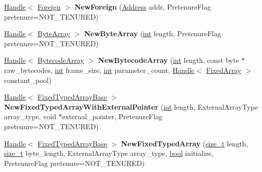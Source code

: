 \begin{DoxyCompactItemize}
\item 
\mbox{\label{classv8_1_1internal_1_1Factory_a885ff62ae48cfbc8fec78203f5eea4d3}} 
\mbox{\hyperlink{classv8_1_1internal_1_1Handle}{Handle}}$<$ \mbox{\hyperlink{classv8_1_1internal_1_1Foreign}{Foreign}} $>$ {\bfseries New\+Foreign} (\mbox{\hyperlink{classuintptr__t}{Address}} addr, Pretenure\+Flag pretenure=N\+O\+T\+\_\+\+T\+E\+N\+U\+R\+ED)
\item 
\mbox{\label{classv8_1_1internal_1_1Factory_a015cfffd3646432f2564a415c4834218}} 
\mbox{\hyperlink{classv8_1_1internal_1_1Handle}{Handle}}$<$ \mbox{\hyperlink{classv8_1_1internal_1_1ByteArray}{Byte\+Array}} $>$ {\bfseries New\+Byte\+Array} (\mbox{\hyperlink{classint}{int}} length, Pretenure\+Flag pretenure=N\+O\+T\+\_\+\+T\+E\+N\+U\+R\+ED)
\item 
\mbox{\label{classv8_1_1internal_1_1Factory_ad5646803ce9c460f62c27d468c5fbc51}} 
\mbox{\hyperlink{classv8_1_1internal_1_1Handle}{Handle}}$<$ \mbox{\hyperlink{classv8_1_1internal_1_1BytecodeArray}{Bytecode\+Array}} $>$ {\bfseries New\+Bytecode\+Array} (\mbox{\hyperlink{classint}{int}} length, const byte $\ast$raw\+\_\+bytecodes, \mbox{\hyperlink{classint}{int}} frame\+\_\+size, \mbox{\hyperlink{classint}{int}} parameter\+\_\+count, \mbox{\hyperlink{classv8_1_1internal_1_1Handle}{Handle}}$<$ \mbox{\hyperlink{classv8_1_1internal_1_1FixedArray}{Fixed\+Array}} $>$ constant\+\_\+pool)
\item 
\mbox{\label{classv8_1_1internal_1_1Factory_a2ddca8c1f844d6d7d6c74df8c0adc9a2}} 
\mbox{\hyperlink{classv8_1_1internal_1_1Handle}{Handle}}$<$ \mbox{\hyperlink{classv8_1_1internal_1_1FixedTypedArrayBase}{Fixed\+Typed\+Array\+Base}} $>$ {\bfseries New\+Fixed\+Typed\+Array\+With\+External\+Pointer} (\mbox{\hyperlink{classint}{int}} length, External\+Array\+Type array\+\_\+type, void $\ast$external\+\_\+pointer, Pretenure\+Flag pretenure=N\+O\+T\+\_\+\+T\+E\+N\+U\+R\+ED)
\item 
\mbox{\label{classv8_1_1internal_1_1Factory_aa933c25d0a196755c00ab0826f7a41d6}} 
\mbox{\hyperlink{classv8_1_1internal_1_1Handle}{Handle}}$<$ \mbox{\hyperlink{classv8_1_1internal_1_1FixedTypedArrayBase}{Fixed\+Typed\+Array\+Base}} $>$ {\bfseries New\+Fixed\+Typed\+Array} (\mbox{\hyperlink{classsize__t}{size\+\_\+t}} length, \mbox{\hyperlink{classsize__t}{size\+\_\+t}} byte\+\_\+length, External\+Array\+Type array\+\_\+type, \mbox{\hyperlink{classbool}{bool}} initialize, Pretenure\+Flag pretenure=N\+O\+T\+\_\+\+T\+E\+N\+U\+R\+ED)

\end{DoxyCompactItemize}
